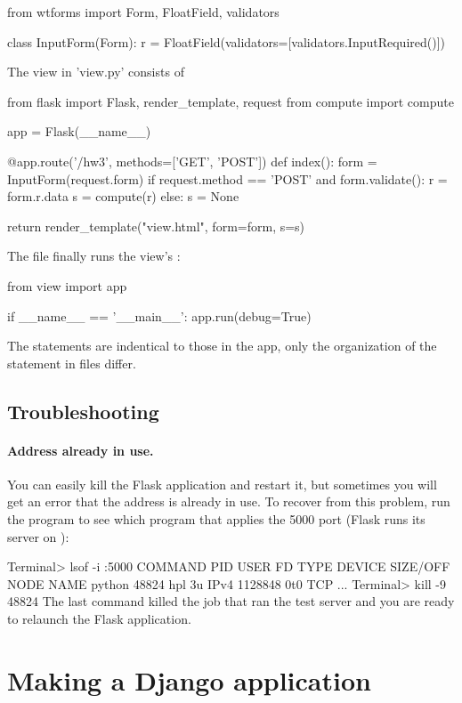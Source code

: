\documentclass[%
oneside,                 %
final,                   %
10pt]{article}
\begin{document}
{{{\bpypro
from wtforms import Form, FloatField, validators

class InputForm(Form):
    r = FloatField(validators=[validators.InputRequired()])
\epypro

The view in 'view.py' consists of

\bpypro
from flask import Flask, render_template, request
from compute import compute

app = Flask(__name__)

@app.route('/hw3', methods=['GET', 'POST'])
def index():
    form = InputForm(request.form)
    if request.method == 'POST' and form.validate():
        r = form.r.data
        s = compute(r)
    else:
        s = None

    return render_template("view.html", form=form, s=s)
\epypro

The  file finally runs the view's :

\bpypro
from view import app

if __name__ == '__main__':
    app.run(debug=True)
\epypro

The statements are indentical to those in the  app, only
the organization of the statement in files differ.


\subsection{Troubleshooting}


\paragraph{Address already in use.}
You can easily kill the Flask application and restart it, but sometimes
you will get an error that the address is already in use.
To recover from this problem, run the  program to see which program
that applies the 5000 port (Flask runs its server on ):

\bsys
Terminal> lsof -i :5000
COMMAND   PID USER   FD   TYPE  DEVICE SIZE/OFF NODE NAME
python  48824  hpl    3u  IPv4 1128848      0t0  TCP ...
Terminal> kill -9 48824
\esys
The last command killed the  job that ran the test server and
you are ready to relaunch the Flask application.

\section{Making a Django application}

}}}
\end{document}
